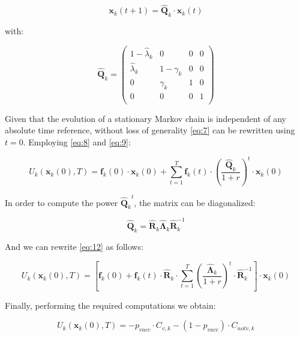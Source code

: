 \documentclass[11pt]{article}
\begin{document}
\begin{equation}\label{eq:10}
	 \mathbf{x}_k(t+1) = \hat{\mathbf{Q}}_k \cdot \mathbf{x}_k(t)
\end{equation}

with:

\begin{equation}\label{eq:11}
	 \hat{\mathbf{Q}}_k = 
	 \left (\begin{array}{cccc} 1-\hat{\lambda}_{k}&0&0&0 \\
	 	\hat{\lambda}_{k}&1-\gamma_{k}&0&0 \\
		0&\gamma_{k}&1&0 \\
		0&0&0&1 \\
	  \end{array} \right)
\end{equation}

Given that the evolution of a stationary Markov chain is independent of any absolute time reference, without loss of generality \eqref{eq:7} can be rewritten using $t = 0$. Employing \eqref{eq:8} and \eqref{eq:9}:

\begin{equation}\label{eq:12}
	U_k(\mathbf{x}_k(0), T) = \mathbf{f}_k(0) \cdot \mathbf{x}_k(0) + \sum_{t=1}^{T} {\mathbf{f}_k(t) \cdot   \left(\frac{ \hat{\mathbf{Q}}_k}{1+r}\right)^t \cdot \mathbf{x}_k(0) }
\end{equation}

In order to compute the power \({\hat{\mathbf{Q}}_k}^t\), the matrix can be diagonalized:

\begin{equation}\label{eq:13}
	\hat{\mathbf{Q}}_k=\hat{\mathbf{R}}_{k}\hat{\mathbf{\Lambda}}_{k}\hat{\mathbf{R}}^{-1}_{k}
\end{equation}

And we can rewrite \eqref{eq:12} as follows:

\begin{equation}\label{eq:14}
	U_k(\mathbf{x}_k(0), T)= \left[ \mathbf{f}_k(0) + \mathbf{f}_k(t) \cdot \hat{\mathbf{R}}_{k} \cdot \sum_{t=1}^{T} { \left(\frac{ \hat{\mathbf{\Lambda}}_{k}}{1+r}\right)^t \cdot \hat{\mathbf{R}}^{-1}_{k}} \right] \cdot \mathbf{x}_k(0)
\end{equation}

Finally, performing the required computations we obtain: 

\begin{equation}\label{eq:15}
	U_k(\mathbf{x}_k(0), T)=-p_{vacc} \cdot C_{v,k} - (1-p_{vacc}) \cdot C_{notv,k}
\end{equation}
\end{document}
